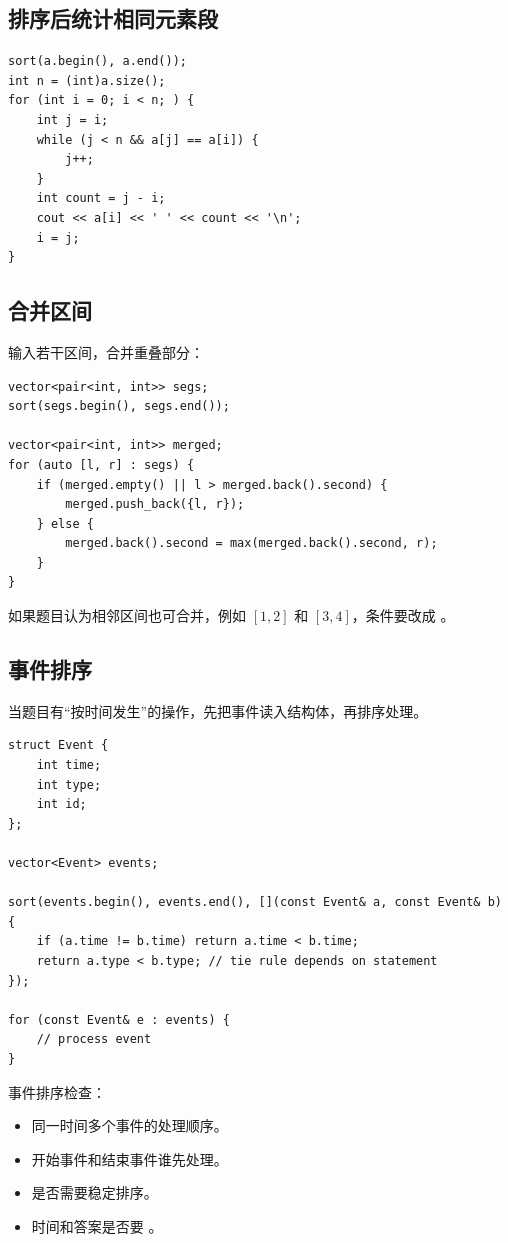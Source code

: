 \subsection{排序后统计相同元素段}

\begin{lstlisting}
sort(a.begin(), a.end());
int n = (int)a.size();
for (int i = 0; i < n; ) {
    int j = i;
    while (j < n && a[j] == a[i]) {
        j++;
    }
    int count = j - i;
    cout << a[i] << ' ' << count << '\n';
    i = j;
}
\end{lstlisting}

\subsection{合并区间}

输入若干区间，合并重叠部分：

\begin{lstlisting}
vector<pair<int, int>> segs;
sort(segs.begin(), segs.end());

vector<pair<int, int>> merged;
for (auto [l, r] : segs) {
    if (merged.empty() || l > merged.back().second) {
        merged.push_back({l, r});
    } else {
        merged.back().second = max(merged.back().second, r);
    }
}
\end{lstlisting}

如果题目认为相邻区间也可合并，例如 $[1,2]$ 和 $[3,4]$，条件要改成 。

\subsection{事件排序}

当题目有“按时间发生”的操作，先把事件读入结构体，再排序处理。

\begin{lstlisting}
struct Event {
    int time;
    int type;
    int id;
};

vector<Event> events;

sort(events.begin(), events.end(), [](const Event& a, const Event& b) {
    if (a.time != b.time) return a.time < b.time;
    return a.type < b.type; // tie rule depends on statement
});

for (const Event& e : events) {
    // process event
}
\end{lstlisting}

事件排序检查：

\begin{itemize}
  \item 同一时间多个事件的处理顺序。
  \item 开始事件和结束事件谁先处理。
  \item 是否需要稳定排序。
  \item 时间和答案是否要 。
\end{itemize}

